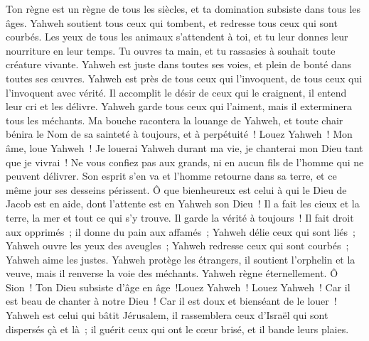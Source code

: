 \begin{multicols}{2}
 Ton règne est un règne de tous les siècles, et ta domination subsiste dans tous les âges.
 Yahweh soutient tous ceux qui tombent, et redresse tous ceux qui sont courbés.
 Les yeux de tous les animaux s'attendent à toi, et tu leur donnes leur nourriture en leur temps.
 Tu ouvres ta main, et tu rassasies à souhait toute créature vivante.
 Yahweh est juste dans toutes ses voies, et plein de bonté dans toutes ses œuvres.
 Yahweh est près de tous ceux qui l'invoquent, de tous ceux qui l'invoquent avec vérité.
 Il accomplit le désir de ceux qui le craignent, il entend leur cri et les délivre.
 Yahweh garde tous ceux qui l'aiment, mais il exterminera tous les méchants.
 Ma bouche racontera la louange de Yahweh, et toute chair bénira le Nom de sa sainteté à toujours, et à perpétuité~!
\VerseOne{}Louez Yahweh~! Mon âme, loue Yahweh~!
Je louerai Yahweh durant ma vie, je chanterai mon Dieu tant que je vivrai~!
Ne vous confiez pas aux grands, ni en aucun fils de l'homme qui ne peuvent délivrer.
Son esprit s'en va et l'homme retourne dans sa terre, et ce même jour ses desseins périssent.
Ô que bienheureux est celui à qui le Dieu de Jacob est en aide, dont l'attente est en Yahweh son Dieu~!
Il a fait les cieux et la terre, la mer et tout ce qui s'y trouve. Il garde la vérité à toujours~!
Il fait droit aux opprimés~; il donne du pain aux affamés~; Yahweh délie ceux qui sont liés~;
Yahweh ouvre les yeux des aveugles~; Yahweh redresse ceux qui sont courbés~; Yahweh aime les justes.
Yahweh protège les étrangers, il soutient l'orphelin et la veuve, mais il renverse la voie des méchants.
Yahweh règne éternellement. Ô Sion~! Ton Dieu subsiste d'âge en âge~!Louez Yahweh~!
\VerseOne{}Louez Yahweh~! Car il est beau de chanter à notre Dieu~! Car il est doux et bienséant de le louer~!
Yahweh est celui qui bâtit Jérusalem, il rassemblera ceux d'Israël qui sont dispersés çà et là~;
il guérit ceux qui ont le cœur brisé, et il bande leurs plaies.

\end{multicols}
